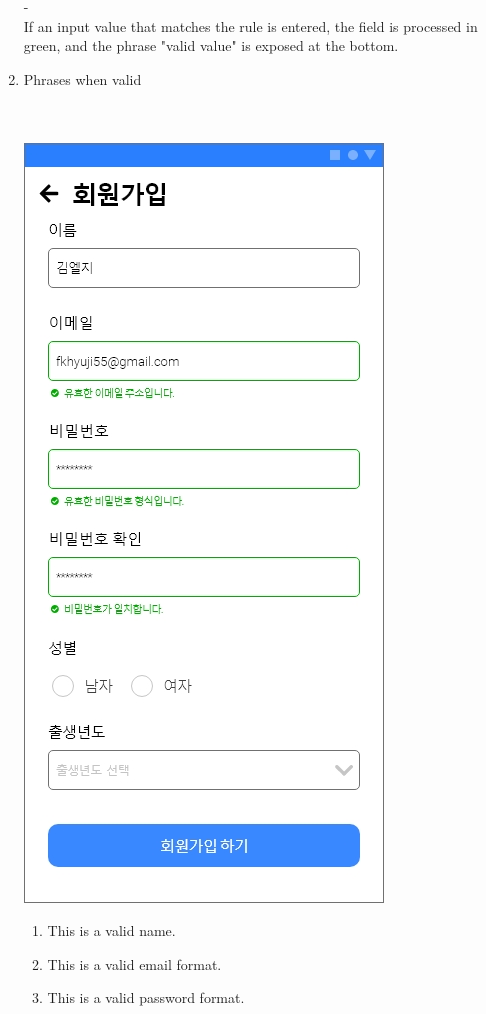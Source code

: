 \documentclass[conference]{IEEEtran}
\begin{document}
\begin{enumerate}
\begin{itemize}
\begin{enumerate}
    \item[-] \\ If an input value that matches the rule is entered, the field is processed in green, and the phrase "valid value" is exposed at the bottom. \\
    \item Phrases when valid \\ \\ \\
    \centerline{\includegraphics[scale=0.28]{회원가입2.jpg}}
    \begin{enumerate}
\item This is a valid name.
\item This is a valid email format.
\item This is a valid password format.

\end{enumerate}
\end{enumerate}
\end{itemize}
\end{enumerate}
\end{document}
